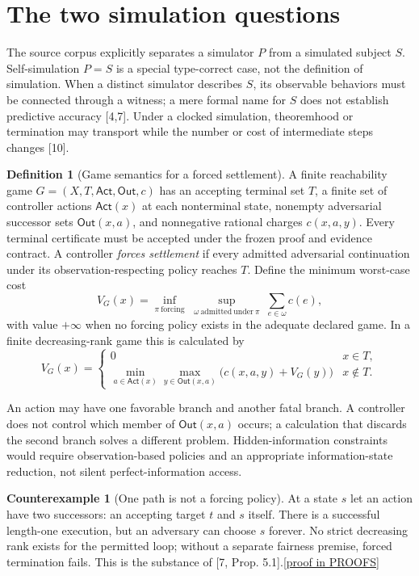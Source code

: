 \documentclass[11pt,letterpaper]{article}
\theoremstyle{definition}
\newtheorem{definition}[theorem]{Definition}
\newtheorem{counterexample}[theorem]{Counterexample}
\theoremstyle{remark}
\newcommand{\Act}{\mathsf{Act}}
\newcommand{\Out}{\mathsf{Out}}
\newcommand{\prooflink}[1]{\hfill\hyperlink{proof:#1}{\footnotesize[proof in PROOFS]}}
\newcommand{\src}[1]{\textup{[#1]}}
\begin{document}
\section{The two simulation questions}
The source corpus explicitly separates a simulator $P$ from a simulated subject $S$. Self-simulation $P=S$ is a special type-correct case, not the definition of simulation. When a distinct simulator describes $S$, its observable behaviors must be connected through a witness; a mere formal name for $S$ does not establish predictive accuracy \src{4,7}. Under a clocked simulation, theoremhood or termination may transport while the number or cost of intermediate steps changes \src{10}.

\begin{definition}[Game semantics for a forced settlement]\label{def:game}
A finite reachability game $G=(X,T,\Act,\Out,c)$ has an accepting terminal set $T$, a finite set of controller actions $\Act(x)$ at each nonterminal state, nonempty adversarial successor sets $\Out(x,a)$, and nonnegative rational charges $c(x,a,y)$. Every terminal certificate must be accepted under the frozen proof and evidence contract. A controller \emph{forces settlement} if every admitted adversarial continuation under its observation-respecting policy reaches $T$. Define the minimum worst-case cost
\[
 V_G(x)=\inf_{\pi\ \mathrm{forcing}}\;\sup_{\omega\ \mathrm{admitted\ under}\ \pi}\;\sum_{e\in\omega}c(e),
\]
with value $+\infty$ when no forcing policy exists in the adequate declared game. In a finite decreasing-rank game this is calculated by
\[
 V_G(x)=\begin{cases}0&x\in T,\\
 \displaystyle\min_{a\in\Act(x)}\max_{y\in\Out(x,a)}\bigl(c(x,a,y)+V_G(y)\bigr)&x\notin T.
 \end{cases}
\]
\end{definition}

An action may have one favorable branch and another fatal branch. A controller does not control which member of $\Out(x,a)$ occurs; a calculation that discards the second branch solves a different problem. Hidden-information constraints would require observation-based policies and an appropriate information-state reduction, not silent perfect-information access.

\begin{counterexample}[One path is not a forcing policy]\label{cex:loop}\hypertarget{claim:loop}{}
At a state $s$ let an action have two successors: an accepting target $t$ and $s$ itself. There is a successful length-one execution, but an adversary can choose $s$ forever. No strict decreasing rank exists for the permitted loop; without a separate fairness premise, forced termination fails. This is the substance of \src{7, Prop. 5.1}.\prooflink{loop}
\end{counterexample}
\end{document}
